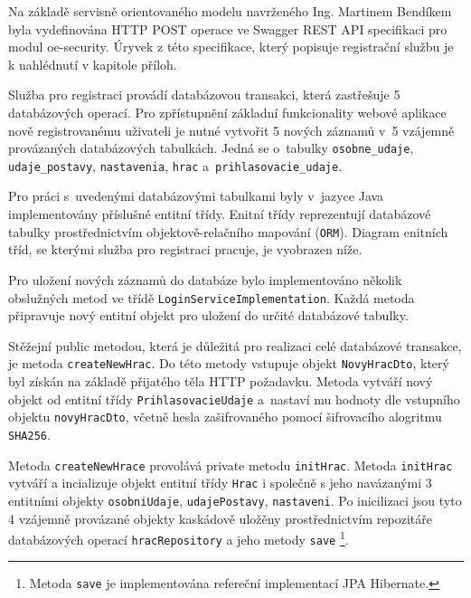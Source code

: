 \documentclass[twoside, 12pt]{article}
\begin{document}
{Na základě servisně orientovaného modelu navrženého Ing. Martinem Bendíkem
byla vydefinována HTTP POST operace ve Swagger REST API specifikaci pro modul oe-security.
Úryvek z této specifikace, který popisuje registrační službu je k nahlédnutí v kapitole příloh.

Služba pro registraci provádí databázovou transakci,
která zastřešuje 5 databázových operací.
Pro zpřístupnění základní funkcionality webové aplikace nově registrovanému uživateli je nutné vytvořit 5 nových záznamů
v~5 vzájemně provázaných databázových tabulkách.
Jedná se o~tabulky \texttt{osobne\_udaje},
\texttt{udaje\_postavy}, \texttt{nastavenia}, \texttt{hrac} a~\texttt{prihlasovacie\_udaje}.

Pro práci s~uvedenými databázovými tabulkami byly v~jazyce Java implementovány příslušné entitní třídy.
Enitní třídy reprezentují databázové tabulky prostřednictvím
objektově-relačního mapování (\texttt{ORM}).
Diagram enitních tříd, se kterými služba pro registraci pracuje, je vyobrazen níže.

\obrazek
{}

\clearpage

Pro uložení nových záznamů do databáze bylo implementováno několik obslužných metod ve třídě \texttt{LoginServiceImplementation}.
Každá metoda připravuje nový entitní objekt pro uložení do určité databázové tabulky.

Stěžejní public metodou, která je důležitá pro realizaci celé databázové transakce, je metoda \texttt{createNewHrac}.
Do této metody vstupuje objekt \texttt{NovyHracDto}, který byl získán na základě přijatého těla HTTP požadavku.
Metoda vytváří nový objekt od entitní třídy \texttt{PrihlasovacieUdaje} a~nastaví mu hodnoty dle vstupního objektu \texttt{novyHracDto}, včetně hesla zašifrovaného pomocí šifrovacího alogritmu \texttt{SHA256}.

Metoda \texttt{createNewHrace} provolává private metodu \texttt{initHrac}.
Metoda \texttt{initHrac} vytváří a incializuje objekt entitní třídy \texttt{Hrac}
i společně s jeho navázanými 3 entitními objekty
 \texttt{osobniUdaje},
\texttt{udajePostavy}, \texttt{nastaveni}.
Po inicilizaci jsou tyto 4 vzájemně provázané objekty kaskádově uložěny prostřednictvím
repozitáře databázových operací \texttt{hracRepository} a jeho metody \texttt{save}
\footnote{Metoda \texttt{save} je implementována refereční implementací JPA Hibernate.}.

}
\end{document}
